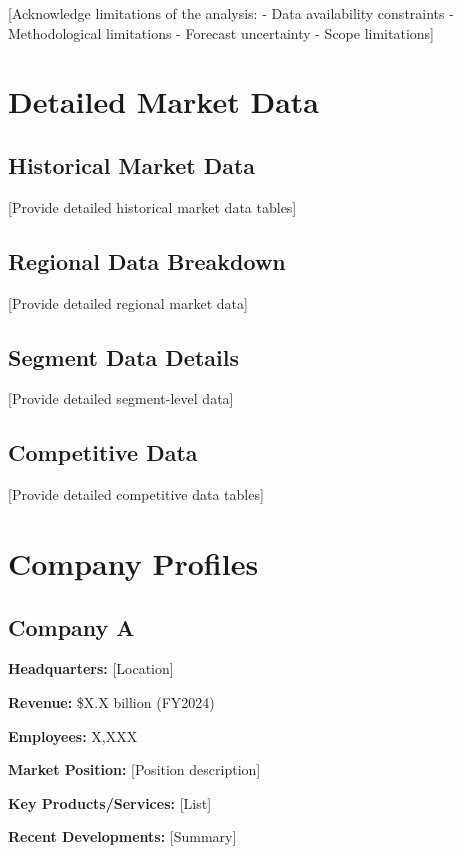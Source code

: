 \documentclass[11pt,letterpaper]{report}
\begin{document}
[Acknowledge limitations of the analysis:
- Data availability constraints
- Methodological limitations
- Forecast uncertainty
- Scope limitations]

\chapter{Detailed Market Data}

\section{Historical Market Data}

[Provide detailed historical market data tables]

\section{Regional Data Breakdown}

[Provide detailed regional market data]

\section{Segment Data Details}

[Provide detailed segment-level data]

\section{Competitive Data}

[Provide detailed competitive data tables]

\chapter{Company Profiles}

\section{Company A}

\begin{calloutbox}
\textbf{Headquarters:} [Location]

\textbf{Revenue:} \$X.X billion (FY2024)

\textbf{Employees:} X,XXX

\textbf{Market Position:} [Position description]

\textbf{Key Products/Services:} [List]

\textbf{Recent Developments:} [Summary]
\end{calloutbox}
\end{document}
